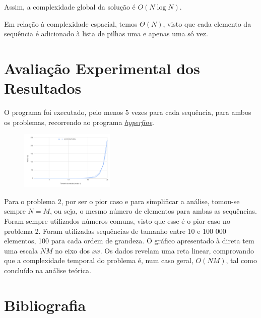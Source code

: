 \documentclass[12pt,a4paper]{article}
\begin{document}
  Assim, a complexidade global da solução é $O(N \log N)$.

  Em relação à complexidade espacial, temos $\Theta(N)$, visto que cada elemento da sequência é adicionado à lista de pilhas uma e apenas uma só vez.

  \section{Avaliação Experimental dos Resultados}


  O programa foi executado, pelo menos 5 vezes para cada sequência, para ambos os problemas, recorrendo ao programa \href{https://github.com/sharkdp/hyperfine}{\textit{hyperfine}}.

  \begin{figure}
    \centering
    \includegraphics[width=0.4\textwidth]{report.png}
  \end{figure}

  Para o problema 2, por ser o pior caso e para simplificar a análise, tomou-se sempre $N = M$, ou seja, o mesmo número de elementos para ambas as sequências.
  Foram sempre utilizados números comuns, visto que esse é o pior caso no problema 2.
  Foram utilizadas sequências de tamanho entre 10 e 100 000 elementos, 100 para cada ordem de grandeza.
  O gráfico apresentado à direta tem uma escala $NM$ no eixo dos $xx$.
  Os dados revelam uma reta linear, comprovando que a complexidade temporal do problema é, num caso geral, $O(NM)$, tal como concluído na análise teórica.

  \section{Bibliografia}

  \printbibliography
\end{document}
